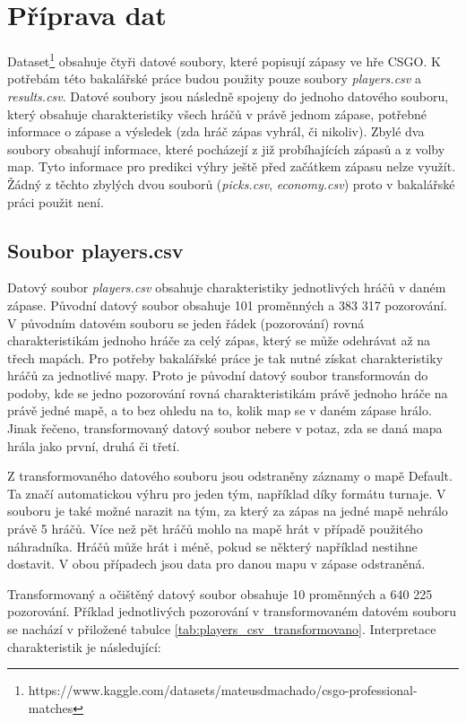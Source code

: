 \section{Příprava dat}
Dataset\footnote{https://www.kaggle.com/datasets/mateusdmachado/csgo-professional-matches} obsahuje čtyři datové soubory, které popisují zápasy ve hře
\ac{CSGO}. K potřebám této bakalářské práce budou použity pouze soubory \textit{players.csv} a \textit{results.csv}. Datové soubory jsou následně spojeny do jednoho datového
souboru, který obsahuje charakteristiky všech hráčů v právě jednom zápase, potřebné informace o zápase a výsledek (zda hráč zápas vyhrál, či nikoliv). Zbylé dva soubory obsahují
informace, které pocházejí z již probíhajících zápasů a z volby map. Tyto informace pro predikci výhry ještě před začátkem zápasu nelze využít. Žádný z těchto
zbylých dvou souborů (\textit{picks.csv}, \textit{economy.csv}) proto v bakalářské práci použit není.

\subsection{Soubor players.csv}
Datový soubor \textit{players.csv} obsahuje charakteristiky jednotlivých hráčů v daném zápase. Původní datový soubor obsahuje 101 proměnných a 383 317 pozorování.
V původním datovém souboru se jeden řádek (pozorování) rovná charakteristikám jednoho hráče za celý zápas, který se může odehrávat až na třech mapách.
Pro potřeby bakalářské práce je tak nutné získat charakteristiky hráčů za jednotlivé mapy. Proto je původní datový soubor transformován do podoby, kde se
jedno pozorování rovná charakteristikám právě jednoho hráče na právě jedné mapě, a to bez ohledu na to, kolik map se v daném zápase hrálo. Jinak řečeno, transformovaný
datový soubor nebere v potaz, zda se daná mapa hrála jako první, druhá či třetí.

Z transformovaného datového souboru jsou odstraněny záznamy o mapě Default. Ta značí automatickou výhru pro jeden tým, například díky formátu turnaje. V souboru je také
možné narazit na tým, za který za zápas na jedné mapě nehrálo právě 5 hráčů. Více než pět hráčů mohlo na mapě hrát v případě použitého náhradníka. 
Hráčů může hrát i méně, pokud se některý například nestihne dostavit. V obou případech jsou data pro danou mapu v zápase odstraněná.

Transformovaný a očištěný datový soubor obsahuje 10 proměnných a 640 225 pozorování. Příklad jednotlivých pozorování v transformovaném datovém souboru se nachází v
přiložené tabulce \ref{tab:players_csv_transformovano}. Interpretace charakteristik je následující:

